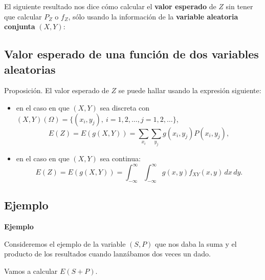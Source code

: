 \documentclass[]{book}
\begin{document}
El siguiente resultado nos dice cómo calcular el \textbf{valor esperado} de \(Z\) sin tener que calcular \(P_Z\) o \(f_Z\), sólo usando la información de la \textbf{variable aleatoria conjunta} \((X,Y)\):

\hypertarget{valor-esperado-de-una-funciuxf3n-de-dos-variables-aleatorias-2}{%
\subsection{Valor esperado de una función de dos variables aleatorias}\label{valor-esperado-de-una-funciuxf3n-de-dos-variables-aleatorias-2}}

Proposición.
El valor esperado de \(Z\) se puede hallar usando la expresión siguiente:

\begin{itemize}
\item
  en el caso en que \((X,Y)\) sea discreta con \((X,Y)(\Omega)=\{(x_i,y_j),\ i=1,2,\ldots, j=1,2,\ldots\}\),
  \[
  E(Z)  = E(g(X,Y))  =\sum_{x_i}\sum_{y_j}g(x_i,y_j)P(x_i,y_j),
  \]
\item
  en el caso en que \((X,Y)\) sea continua:
  \[
  E(Z)=E(g(X,Y))=\int_{-\infty}^\infty \int_{-\infty}^\infty g(x,y)f_{XY}(x,y)\, dx\, dy.
  \]
\end{itemize}

\hypertarget{ejemplo-58}{%
\subsection{Ejemplo}\label{ejemplo-58}}

\textbf{Ejemplo}

Consideremos el ejemplo de la variable \((S,P)\) que nos daba la suma y el producto de los resultados cuando lanzábamos dos veces un dado.

Vamos a calcular \(E(S+P)\).
\end{document}
